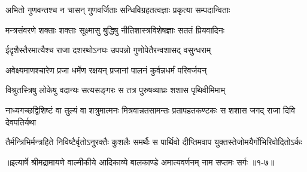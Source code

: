 \twolineshloka
{अभितो गुणवन्तश्च न चासन् गुणवर्जिताः}
{सन्धिविग्रहतत्वज्ञाः प्रकृत्या सम्पदान्विताः} %

\twolineshloka
{मन्त्रसंवरणे शक्ताः शक्ताः सूक्ष्मासु बुद्धिषु}
{नीतिशास्त्रविशेषज्ञाः सततं प्रियवादिनः} %

\twolineshloka
{ईदृशैस्तैरमात्यैश्च राजा दशरथोऽनघः}
{उपपन्नो गुणोपेतैरन्वशासद् वसुन्धराम्} %

\twolineshloka
{अवेक्ष्यमाणश्चारेण प्रजा धर्मेण रक्षयन्}
{प्रजानां पालनं कुर्वन्नधर्मं परिवर्जयन्} %

\twolineshloka
{विश्रुतस्त्रिषु लोकेषु वदान्यः सत्यसङ्गरः}
{स तत्र पुरुषव्याघ्रः शशास पृथिवीमिमाम्} %

\threelineshloka
{नाध्यगच्छद्विशिष्टं वा तुल्यं वा शत्रुमात्मनः}
{मित्रवान्नतसामन्तः प्रतापहतकण्टकः}
{स शशास जगद् राजा दिवि देवपतिर्यथा} %

\twolineshloka
{तैर्मन्त्रिभिर्मन्त्रहिते निविष्टैर्वृतोऽनुरक्तैः कुशलैः समर्थैः}
{स पार्थिवो दीप्तिमवाप युक्तस्तेजोमयैर्गोभिरिवोदितोऽर्कः} %


॥इत्यार्षे श्रीमद्रामायणे वाल्मीकीये आदिकाव्ये बालकाण्डे अमात्यवर्णनम् नाम सप्तमः सर्गः ॥१-७॥
